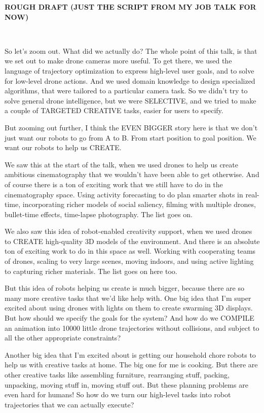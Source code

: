 \textbf{ROUGH DRAFT (JUST THE SCRIPT FROM MY JOB TALK FOR NOW)}

~

\hspace{-15pt}So let’s zoom out. What did we actually do?
The whole point of this talk, is that we set out to make drone cameras more useful.
To get there, we used the language of trajectory optimization to express high-level user goals, and to solve for low-level drone actions.
And we used domain knowledge to design specialized algorithms, that were tailored to a particular camera task.
So we didn’t try to solve general drone intelligence, but we were SELECTIVE, and we tried to make a couple of TARGETED CREATIVE tasks, easier for users to specify.

But zooming out further, I think the EVEN BIGGER story here is that we don’t just want our robots to go from A to B.
From start position to goal position.
We want our robots to help us CREATE.

We saw this at the start of the talk, when we used drones to help us create ambitious cinematography that we wouldn’t have been able to get otherwise.
And of course there is a ton of exciting work that we still have to do in the cinematography space.
Using activity forecasting to do plan smarter shots in real-time, incorporating richer models of social saliency, filming with multiple drones, bullet-time effects, time-lapse photography.
The list goes on.

We also saw this idea of robot-enabled creativity support, when we used drones to CREATE high-quality 3D models of the environment.
And there is an absolute ton of exciting work to do in this space as well.
Working with cooperating teams of drones, scaling to very large scenes, moving indoors, and using active lighting to capturing richer materials.
The list goes on here too.

But this idea of robots helping us create is much bigger, because there are so many more creative tasks that we’d like help with.
One big idea that I’m super excited about using drones with lights on them to create swarming 3D displays.
But how should we specify the goals for the system?
And how do we COMPILE an animation into 10000 little drone trajectories without collisions, and subject to all the other appropriate constraints?

Another big idea that I’m excited about is getting our household chore robots to help us with creative tasks at home.
The big one for me is cooking.
But there are other creative tasks like assembling furniture, rearranging stuff, packing, unpacking, moving stuff in, moving stuff out.
But these planning problems are even hard for humans!
So how do we turn our high-level tasks into robot trajectories that we can actually execute?

